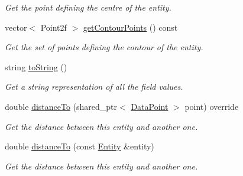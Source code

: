 \begin{DoxyCompactItemize}
\begin{DoxyCompactList}\small\item\em \-Get the point defining the centre of the entity. \end{DoxyCompactList}\item 
vector$<$ \-Point2f $>$ \hyperlink{classmultiscale_1_1analysis_1_1Entity_a8cc2809f7eb42747727b70049b7af3a3}{get\-Contour\-Points} () const 
\begin{DoxyCompactList}\small\item\em \-Get the set of points defining the contour of the entity. \end{DoxyCompactList}\item 
string \hyperlink{classmultiscale_1_1analysis_1_1Entity_aedae50d85d369b0e68fa6433d7e3fec6}{to\-String} ()
\begin{DoxyCompactList}\small\item\em \-Get a string representation of all the field values. \end{DoxyCompactList}\item 
double \hyperlink{classmultiscale_1_1analysis_1_1Entity_a39cb4bb856c295c82676085d976d58e8}{distance\-To} (shared\-\_\-ptr$<$ \hyperlink{classmultiscale_1_1analysis_1_1DataPoint}{\-Data\-Point} $>$ point) override
\begin{DoxyCompactList}\small\item\em \-Get the distance between this entity and another one. \end{DoxyCompactList}\item 
double \hyperlink{classmultiscale_1_1analysis_1_1Entity_a9c3eb0f38038fe3bd0b7680c62577a64}{distance\-To} (const \hyperlink{classmultiscale_1_1analysis_1_1Entity}{\-Entity} \&entity)
\begin{DoxyCompactList}\small\item\em \-Get the distance between this entity and another one. \end{DoxyCompactList}\end{DoxyCompactItemize}
